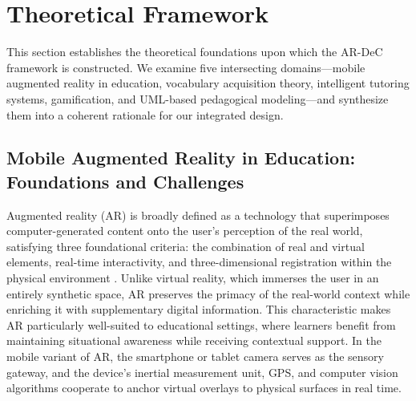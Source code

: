
\section{Theoretical Framework}
\label{sec:theoretical}

This section establishes the theoretical foundations upon which the AR-DeC framework is constructed. We examine five intersecting domains---mobile augmented reality in education, vocabulary acquisition theory, intelligent tutoring systems, gamification, and UML-based pedagogical modeling---and synthesize them into a coherent rationale for our integrated design.

\subsection{Mobile Augmented Reality in Education: Foundations and Challenges}
\label{subsec:ar_education}

Augmented reality (AR) is broadly defined as a technology that superimposes computer-generated content onto the user's perception of the real world, satisfying three foundational criteria: the combination of real and virtual elements, real-time interactivity, and three-dimensional registration within the physical environment \cite{Azuma1997}. Unlike virtual reality, which immerses the user in an entirely synthetic space, AR preserves the primacy of the real-world context while enriching it with supplementary digital information. This characteristic makes AR particularly well-suited to educational settings, where learners benefit from maintaining situational awareness while receiving contextual support. In the mobile variant of AR, the smartphone or tablet camera serves as the sensory gateway, and the device's inertial measurement unit, GPS, and computer vision algorithms cooperate to anchor virtual overlays to physical surfaces in real time.

